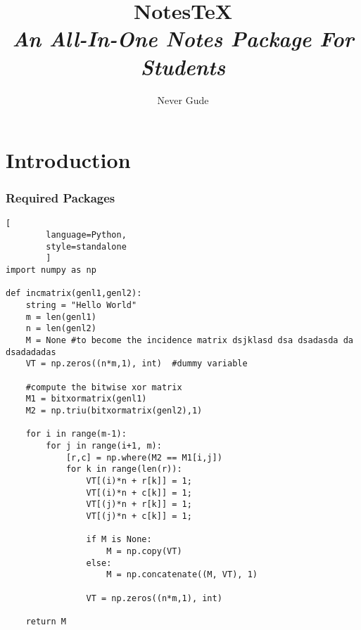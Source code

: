 \documentclass[10pt]{article}
\begin{document}
	\title{{Notes\TeX}\\{\normalsize{\itshape An All-In-One Notes Package For Students}}}
	\author{Never Gude}
	\maketitle
	\newpage
	\pagestyle{fancynotes}
	\part{Introduction}

	\section{Required Packages}\label{sec:reqpackages}

	\begin{lstlisting}[
		language=Python,
		style=standalone
		]
import numpy as np

def incmatrix(genl1,genl2):
	string = "Hello World"
	m = len(genl1)
	n = len(genl2)
	M = None #to become the incidence matrix dsjklasd dsa dsadasda da dsadadadas
	VT = np.zeros((n*m,1), int)  #dummy variable

	#compute the bitwise xor matrix
	M1 = bitxormatrix(genl1)
	M2 = np.triu(bitxormatrix(genl2),1)

	for i in range(m-1):
		for j in range(i+1, m):
			[r,c] = np.where(M2 == M1[i,j])
			for k in range(len(r)):
				VT[(i)*n + r[k]] = 1;
				VT[(i)*n + c[k]] = 1;
				VT[(j)*n + r[k]] = 1;
				VT[(j)*n + c[k]] = 1;

				if M is None:
					M = np.copy(VT)
				else:
					M = np.concatenate((M, VT), 1)

				VT = np.zeros((n*m,1), int)

	return M

	\end{lstlisting}
\end{document}
